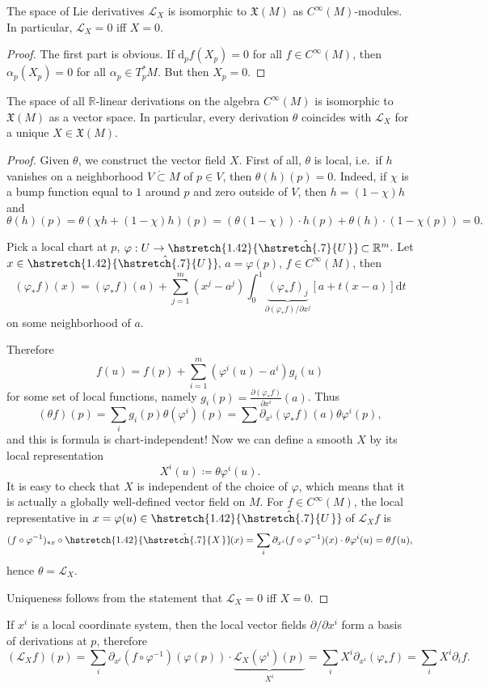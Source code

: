 \documentclass[english,letterpaper]{article}%
\numberwithin{equation}{section}
\numberwithin{figure}{section}
\numberwithin{table}{section}
\theoremstyle{definition}
\theoremstyle{definition}
\theoremstyle{definition}
\theoremstyle{plain}
\theoremstyle{plain}
\theoremstyle{plain}
\theoremstyle{plain}
\theoremstyle{remark}
\theoremstyle{remark}
\newcommand{\dd}{{\mathrm{d}}}
\newcommand{\Lie}{\mathcal{L}}
\newcommand{\fX}{\mathfrak{X}}
\newcommand\wh[1]{\hstretch{1.42}{\hat{\hstretch{.7}{#1\mkern2mu}}}\mkern-2mu} %
\begin{document}
\begin{prop}
The space  of Lie derivatives $\Lie_X$ is isomorphic to $\fX(M)$ as $C^\infty(M)$-modules. In particular, $\Lie_X=0$ iff $X=0$.
\end{prop}
\begin{proof}
The first part is obvious. If $\dd_p f(X_p)=0$ for all $f\in C^\infty(M)$, then $\alpha_p(X_p)=0$ for all $\alpha_p\in T_p^\ast M$. But then $X_p=0$.
\end{proof}
\begin{prop}\label{lie derivatives and vector fields}
The space of all $\mathbb{R}$-linear derivations on the algebra $C^\infty(M)$ is isomorphic to $\fX(M)$ as a vector space. In particular, every derivation $\theta$ coincides with $\Lie_X$ for a unique $X\in\fX(M)$.
\end{prop}
\begin{proof}
    Given $\theta$, we construct the vector field $X$.
    First of all, $\theta$ is local, i.e.\ if $h$ vanishes on a neighborhood $V\mathring{\subset} M$ of $p\in V$, then $\theta(h)(p)=0$. Indeed, if $\chi$ is a bump function equal to $1$ around $p$ and zero outside of $V$, then $h=(1-\chi)h$ and
    \[\theta(h)(p)=\theta(\chi h+(1-\chi)h)(p)=(\theta(1-\chi))\cdot h(p)+\theta(h)\cdot (1-\chi(p))=0.\]

    Pick a local chart at $p$, $\varphi:U\to\wh{U}\subset\mathbb{R}^m$. Let $x\in\wh{U}$, $a=\varphi(p)$, $f\in C^\infty(M)$, then 
    \[(\varphi_\ast f)(x)=(\varphi_\ast f)(a)+\sum_{j=1}^m (x^j-a^j)\int_0^1 \underbrace{(\varphi_\ast f)_j}_{\partial(\varphi_\ast f)/\partial x^j} [a+t(x-a)]\dd t\]
    on some neighborhood of $a$.
    
    Therefore \[f(u)=f(p)+\sum_{i=1}^m (\varphi^i(u)-a^i)g_i(u)\] for some set of local functions, namely $g_i(p)=\frac{\partial(\varphi_\ast f)}{\partial x^i} (a)$. Thus
    \[(\theta f)(p)=\sum_i g_i(p)\theta(\varphi^i)(p)=\sum \partial_{x^i}(\varphi_\ast f)(a) \theta \varphi^i(p),\]
    and this is formula is chart-independent! Now we can define a smooth $X$ by its local representation
    \[X^i(u)\coloneqq \theta\varphi^i(u).\]
    It is easy to check that $X$ is independent of the choice of $\varphi$, which means that it is actually a globally well-defined vector field on $M$. For $f\in C^\infty(M)$, the local representative in $x=\varphi(u)\in\wh{U}$ of $\Lie_X f$ is 
    \[(f\circ\varphi^{-1})_{\ast x}\circ \wh{X}(x)=\sum_i \partial_{x^i}(f\circ \varphi^{-1})(x)\cdot \theta \varphi^i (u)=\theta f(u),\]
    hence $\theta=\Lie_X$.
    
    Uniqueness follows from the statement that $\Lie_X=0$ iff $X=0$.
\end{proof}
\begin{cor}
If $x^i$ is a local coordinate system, then the local vector fields $\partial/\partial x^i$ form a basis of derivations at $p$, therefore 
\[(\Lie_X f)(p)=\sum_i \partial_{x^i}(f\circ\varphi^{-1})(\varphi(p))\cdot \underbrace{\Lie_X (\varphi^i)(p)}_{X^i}=\sum_i X^i \partial_{x^i}(\varphi_\ast f)=\sum_i X^i \partial_{i} f.\]
\end{cor}
\end{document}
